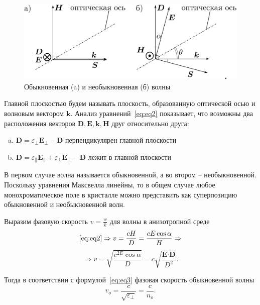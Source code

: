 \documentclass[12pt]{article}
\renewcommand{\vec}{\textbf}
\begin{document}
    \begin{figure}
        \label{fig:fig1}
        \centering
        \includegraphics[width=\linewidth]{pic/vecdiag}
        \caption{Обыкновенная (a) и необыкновенная (б) волны}
    \end{figure}
    Главной плоскостью будем называть плоскость, образованную оптической осью и волновым вектором $\vec{k}$.
    Анализ уравнений\ \eqref{eq:eq2} показывает, что возможны два расположения векторов
    $\vec{D}, \vec{E}, \vec{k}, \vec{H}$ друг относительно друга:
    \begin{enumerate}[(a)]
        \item $\vec{D} = \varepsilon_{\perp} \vec{E}_{\perp}$ -- $\vec{D}$ перпендикулярен главной плоскости
        \item $\vec{D} = \varepsilon_{\parallel} \vec{E}_{\parallel} + \varepsilon_{\perp} \vec{E}_{\perp}$ --
        $\vec{D}$ лежит в главной плоскости
    \end{enumerate}

    В первом случае волна называется обыкновенной, а во втором -- необыкновенной.
    Поскольку уравнения Максвелла линейны, то в общем случае любое монохроматическое поле в кристалле
    можно представить как суперпозицию обыкновенной и необыкновенной волн.

    Выразим фазовую скорость $v = \frac{w}{k}$ для волны в анизотропной среде
    \begin{equation*}
        \eqref{eq:eq2} \Rightarrow v = \frac{cH}{D} = \frac{cE\cos{\alpha}}{H} \Rightarrow
    \end{equation*}
    \begin{equation}
        \label{eq:eq3}
        \Rightarrow v = \sqrt{\frac{c^{2E}\cos{\alpha}}{D}} = c\sqrt{\frac{\vec{E}\cdot\vec{D}}{D^2}}.
    \end{equation}

    Тогда в соответствии с формулой\ \eqref{eq:eq3} фазовая скорость обыкновенной волны
    \begin{equation}
        \label{eq:eq4}
        v_o = \frac{c}{\sqrt{\varepsilon_{\perp}}} = \frac{c}{n_o}.
    \end{equation}
\end{document}
